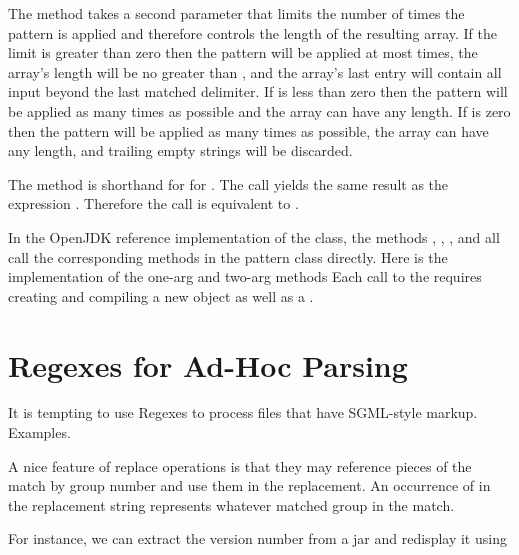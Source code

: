 The method 
takes a second  parameter that limits the number of
times the pattern is applied and therefore controls the length of the
resulting array.  If the limit  is greater than zero then
the pattern will be applied at most  times, the array's length
will be no greater than , and the array's last entry will contain all
input beyond the last matched delimiter. If  is less than zero
then the pattern will be applied as many times as possible and the array can
have any length. If  is zero then the pattern will be applied as many
times as possible, the array can have any length, and trailing empty
strings will be discarded.  

The method  is shorthand for for .
The call  yields the same result as the expression
. 
Therefore the call  
is equivalent to 
.

In the OpenJDK reference implementation of the  class,
the methods , , ,
and  all call the corresponding methods in the pattern class
directly.
Here is the implementation of the one-arg and two-arg  methods
%
%
Each call to the  requires creating and compiling
a new  object as well as a .





\section{Regexes for Ad-Hoc Parsing}\label{section:adhoc-parser}

It is tempting to use Regexes to process files that have SGML-style markup.
Examples.


A nice feature of replace operations is that they may reference
pieces of the match by group number and use them in the replacement.
An occurrence of  in the replacement string
represents whatever matched group  in the match.

For instance, we can extract the version number from a jar and
redisplay it using
%

